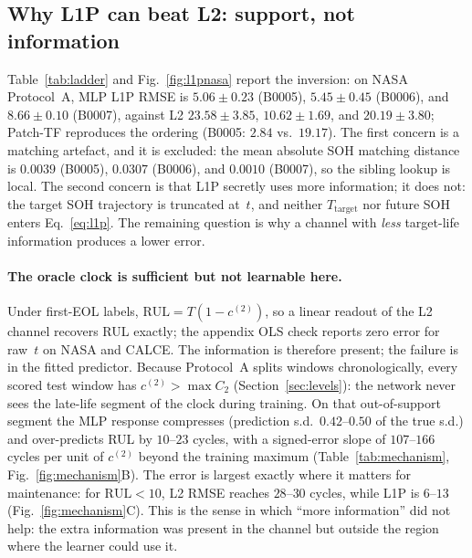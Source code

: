 \documentclass[preprint,12pt]{elsarticle}
\begin{document}


\subsection{Why L1P can beat L2: support, not information}
\label{sec:mechanism}

Table~\ref{tab:ladder} and Fig.~\ref{fig:l1pnasa} report the inversion: on NASA Protocol~A, MLP L1P RMSE is $5.06\pm0.23$ (B0005), $5.45\pm0.45$ (B0006), and $8.66\pm0.10$ (B0007), against L2 $23.58\pm3.85$, $10.62\pm1.69$, and $20.19\pm3.80$; Patch-TF reproduces the ordering (B0005: $2.84$ vs.\ $19.17$).
The first concern is a matching artefact, and it is excluded: the mean absolute SOH matching distance is $0.0039$ (B0005), $0.0307$ (B0006), and $0.0010$ (B0007), so the sibling lookup is local.
The second concern is that L1P secretly uses more information; it does not: the target SOH trajectory is truncated at~$t$, and neither $T_{\mathrm{target}}$ nor future SOH enters Eq.~\eqref{eq:l1p}.
The remaining question is why a channel with \emph{less} target-life information produces a lower error.

\paragraph{The oracle clock is sufficient but not learnable here.}
Under first-EOL labels, $\mathrm{RUL}=T(1-c^{(2)})$, so a linear readout of the L2 channel recovers RUL exactly; the appendix OLS check reports zero error for raw~$t$ on NASA and CALCE.
The information is therefore present; the failure is in the fitted predictor.
Because Protocol~A splits windows chronologically, every scored test window has $c^{(2)}>\max C_2$ (Section~\ref{sec:levels}): the network never sees the late-life segment of the clock during training.
On that out-of-support segment the MLP response compresses (prediction s.d.\ $0.42$--$0.50$ of the true s.d.) and over-predicts RUL by $10$--$23$ cycles, with a signed-error slope of $107$--$166$ cycles per unit of $c^{(2)}$ beyond the training maximum (Table~\ref{tab:mechanism}, Fig.~\ref{fig:mechanism}B).
The error is largest exactly where it matters for maintenance: for $\mathrm{RUL}<10$, L2 RMSE reaches $28$--$30$ cycles, while L1P is $6$--$13$ (Fig.~\ref{fig:mechanism}C).
This is the sense in which “more information” did not help: the extra information was present in the channel but outside the region where the learner could use it.
\end{document}
